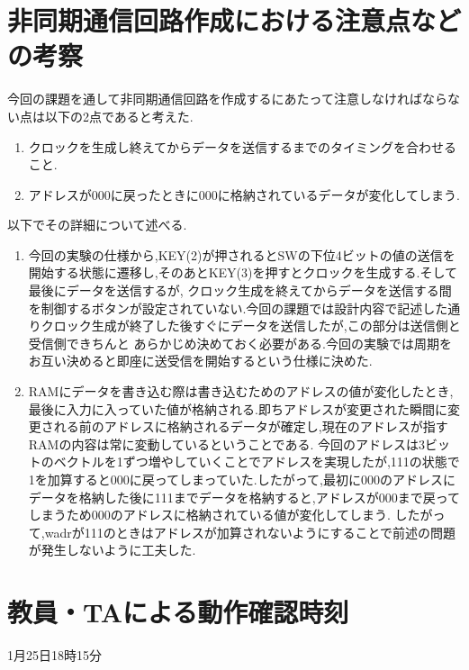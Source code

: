 \documentclass[dvipdfmx]{jarticle}
\begin{document}
\section{非同期通信回路作成における注意点などの考察}
今回の課題を通して非同期通信回路を作成するにあたって注意しなければならない点は以下の2点であると考えた.
\begin{enumerate}
  \item クロックを生成し終えてからデータを送信するまでのタイミングを合わせること.
  \item アドレスが000に戻ったときに000に格納されているデータが変化してしまう.
\end{enumerate}
以下でその詳細について述べる.
\begin{enumerate}
  \item 今回の実験の仕様から,KEY(2)が押されるとSWの下位4ビットの値の送信を開始する状態に遷移し,そのあとKEY(3)を押すとクロックを生成する.そして最後にデータを送信するが,
クロック生成を終えてからデータを送信する間を制御するボタンが設定されていない.今回の課題では設計内容で記述した通りクロック生成が終了した後すぐにデータを送信したが,この部分は送信側と受信側できちんと
あらかじめ決めておく必要がある.今回の実験では周期をお互い決めると即座に送受信を開始するという仕様に決めた.
  \item RAMにデータを書き込む際は書き込むためのアドレスの値が変化したとき,最後に入力に入っていた値が格納される.即ちアドレスが変更された瞬間に変更される前のアドレスに格納されるデータが確定し,現在のアドレスが指すRAMの内容は常に変動しているということである.
今回のアドレスは3ビットのベクトルを1ずつ増やしていくことでアドレスを実現したが,111の状態で1を加算すると000に戻ってしまっていた.したがって,最初に000のアドレスにデータを格納した後に111までデータを格納すると,アドレスが000まで戻ってしまうため000のアドレスに格納されている値が変化してしまう.
したがって,wadrが111のときはアドレスが加算されないようにすることで前述の問題が発生しないように工夫した.
\end{enumerate}
\section{教員・TAによる動作確認時刻}
1月25日18時15分
\end{document}
